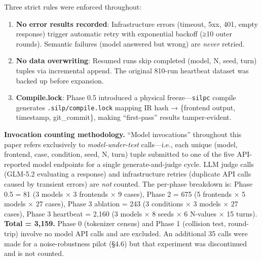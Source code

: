 Three strict rules were enforced throughout:



\begin{enumerate}

\def\labelenumi{\arabic{enumi}.}

\tightlist

\item

  \textbf{No error results recorded}: Infrastructure errors (timeout, 5xx, 401, empty response) trigger automatic retry with exponential backoff (≥10 outer rounds). Semantic failures (model answered but wrong) are \emph{never} retried.

\item

  \textbf{No data overwriting}: Resumed runs skip completed (model, N, seed, turn) tuples via incremental append. The original 810-run heartbeat dataset was backed up before expansion.

\item

  \textbf{Compile.lock}: Phase 0.5 introduced a physical freeze---\texttt{silpc} compile generates \texttt{.silp/compile.lock} mapping IR hash → \{frontend output, timestamp, git\_commit\}, making ``first-pass'' results tamper-evident.

\end{enumerate}



\textbf{Invocation counting methodology.} ``Model invocations'' throughout this paper refers exclusively to \emph{model-under-test} calls---i.e., each unique (model, frontend, case, condition, seed, N, turn) tuple submitted to one of the five API-reported model endpoints for a single generate-and-judge cycle. LLM judge calls (GLM-5.2 evaluating a response) and infrastructure retries (duplicate API calls caused by transient errors) are \emph{not} counted. The per-phase breakdown is: Phase 0.5 = 81 (3 models × 3 frontends × 9 cases), Phase 2 = 675 (5 frontends × 5 models × 27 cases), Phase 3 ablation = 243 (3 conditions × 3 models × 27 cases), Phase 3 heartbeat = 2,160 (3 models × 8 seeds × 6 N-values × 15 turns). \textbf{Total = 3,159.} Phase 0 (tokenizer census) and Phase 1 (collision test, round-trip) involve no model API calls and are excluded. An additional 35 calls were made for a noise-robustness pilot (§4.6) but that experiment was discontinued and is not counted.



